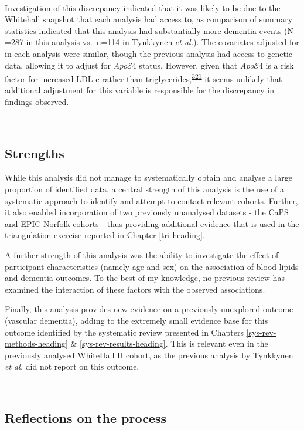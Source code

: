 \documentclass[a4paper, twoside]{templates/ociamthesis}
\begin{document}
~

Investigation of this discrepancy indicated that it was likely to be due to the Whitehall snapshot that each analysis had access to, as comparison of summary statistics indicated that this analysis had substantially more dementia events (N =287 in this analysis vs.~n=114 in Tynkkynen \emph{et al.}). The covariates adjusted for in each analysis were similar, though the previous analysis had access to genetic data, allowing it to adjust for \emph{Apo}\(\mathcal{E}4\) status. However, given that \emph{Apo}\(\mathcal{E}4\) is a risk factor for increased LDL-c rather than triglycerides,\textsuperscript{\protect\hyperlink{ref-bennet2007}{321}} it seems unlikely that additional adjustment for this variable is responsible for the discrepancy in findings observed.

~

\hypertarget{strengths-1}{%
\subsection{Strengths}\label{strengths-1}}

While this analysis did not manage to systematically obtain and analyse a large proportion of identified data, a central strength of this analysis is the use of a systematic approach to identify and attempt to contact relevant cohorts. Further, it also enabled incorporation of two previously unanalysed datasets - the CaPS and EPIC Norfolk cohorts - thus providing additional evidence that is used in the triangulation exercise reported in Chapter \ref{tri-heading}.

A further strength of this analysis was the ability to investigate the effect of participant characteristics (namely age and sex) on the association of blood lipids and dementia outcomes. To the best of my knowledge, no previous review has examined the interaction of these factors with the observed associations.

Finally, this analysis provides new evidence on a previously unexplored outcome (vascular dementia), adding to the extremely small evidence base for this outcome identified by the systematic review presented in Chapters \ref{sys-rev-methods-heading} \& \ref{sys-rev-results-heading}. This is relevant even in the previously analysed WhiteHall II cohort, as the previous analysis by Tynkkynen \emph{et al.} did not report on this outcome.

~

\hypertarget{reflections-on-the-process}{%
\subsection{Reflections on the process}\label{reflections-on-the-process}}
\end{document}
